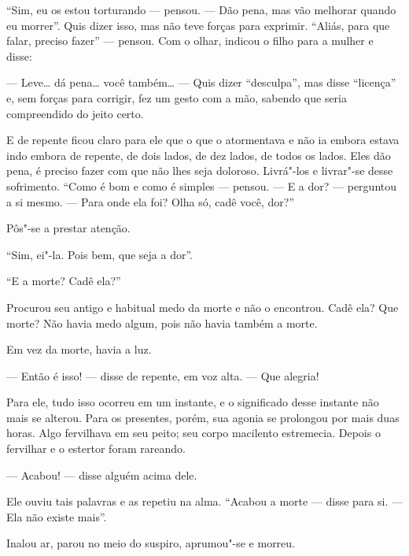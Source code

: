 ``Sim, eu os estou torturando --- pensou. --- Dão pena, mas vão melhorar
quando eu morrer''. Quis dizer isso, mas não teve forças para exprimir.
``Aliás, para que falar, preciso fazer'' --- pensou. Com o olhar, indicou
o filho para a mulher e disse:

--- Leve\ldots{} dá pena\ldots{} você também\ldots{} --- Quis dizer ``desculpa'', mas disse
``licença'' e, sem forças para corrigir, fez um gesto com a mão, sabendo
que seria compreendido do jeito certo.

E de repente ficou claro para ele que o que o atormentava e não ia
embora estava indo embora de repente, de dois lados, de dez lados, de
todos os lados. Eles dão pena, é preciso fazer com que não lhes seja
doloroso. Livrá"-los e livrar"-se desse sofrimento. ``Como é bom e como é
simples --- pensou. --- E a dor? --- perguntou a si mesmo. --- Para onde ela
foi? Olha só, cadê você, dor?''

Pôs"-se a prestar atenção.

``Sim, ei"-la. Pois bem, que seja a dor''.

``E a morte? Cadê ela?''

Procurou seu antigo e habitual medo da morte e não o encontrou. Cadê
ela? Que morte? Não havia medo algum, pois não havia também a morte.

Em vez da morte, havia a luz.

--- Então é isso! --- disse de repente, em voz alta. --- Que alegria!

Para ele, tudo isso ocorreu em um instante, e o significado desse
instante não mais se alterou. Para os presentes, porém, sua agonia se
prolongou por mais duas horas. Algo fervilhava em seu peito; seu corpo
macilento estremecia. Depois o fervilhar e o estertor foram rareando.

--- Acabou! --- disse alguém acima dele.

Ele ouviu tais palavras e as repetiu na alma. ``Acabou a morte --- disse
para si. --- Ela não existe mais''.

Inalou ar, parou no meio do suspiro, aprumou"-se e morreu.
